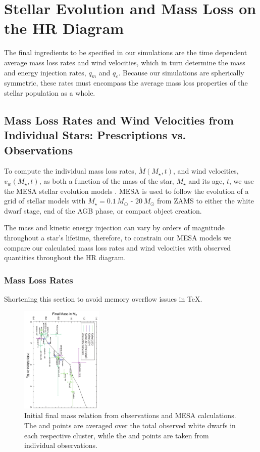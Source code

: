 \documentclass[fleqn,usenatbib]{mnras}
\begin{document}
\section{Stellar Evolution and Mass Loss on the HR Diagram} \label{section:stellarEvolution}

The final ingredients to be specified in our simulations are the time dependent average mass loss rates and wind velocities, which in turn determine the mass and energy injection rates, $q_m$ and $q_\varepsilon$.  Because our simulations are spherically symmetric, these rates must encompass the average mass loss properties of the stellar population as a whole.

\subsection{Mass Loss Rates and Wind Velocities from Individual Stars: Prescriptions vs. Observations}

 To compute the individual mass loss rates, $\dot{M}(M_\star,t)$,  and wind velocities, $v_w(M_\star,t)$,  as both a function of the mass of the star, $M_\star$ and its age, $t$, we use the MESA stellar evolution models \citep{paxton2011}.
MESA is used to follow the evolution of a grid of stellar models with $M_\star = 0.1 \, M_\odot$ - 
$20 \, M_\odot$ from ZAMS to either the white dwarf stage, end of the AGB phase, or 
compact object creation.

 The mass and kinetic energy injection can vary by orders of magnitude throughout a star's lifetime, therefore, to constrain our MESA models we compare our calculated mass loss rates and wind velocities with observed quantities throughout the HR diagram. 




\subsubsection{Mass Loss Rates} \label{section:masslossrates}


Shortening this section to avoid memory overflow issues in TeX.

\begin{figure}
\centering\includegraphics[width=0.35\textwidth, angle=90]{if_mod2.pdf}
\caption{ Initial final mass relation from observations and MESA calculations. The \citealt{kalirai2013a} and \citealt{kalirai2013b} points are averaged over the total observed white dwarfs in each respective cluster, while the \citealt{kulebi2013} and \citealt{zhao2012} points are taken from individual observations.}
\label{fig:ifrelation}
\end{figure} 
\end{document}
